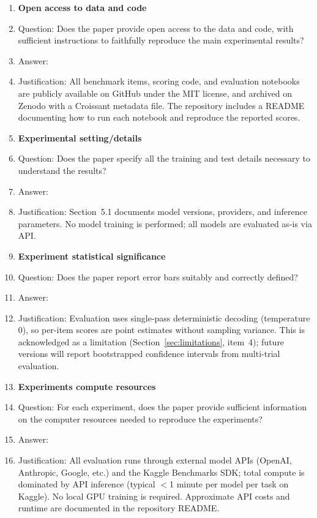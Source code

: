 \documentclass{article}
\begin{document}
\begin{enumerate}
\item \textbf{Open access to data and code}
    \item[] Question: Does the paper provide open access to the data and code, with sufficient instructions to faithfully reproduce the main experimental results?
    \item[] Answer: \answerYes{}
    \item[] Justification: All benchmark items, scoring code, and evaluation notebooks are publicly available on GitHub under the MIT license, and archived on Zenodo with a Croissant metadata file. The repository includes a README documenting how to run each notebook and reproduce the reported scores.

\item \textbf{Experimental setting/details}
    \item[] Question: Does the paper specify all the training and test details necessary to understand the results?
    \item[] Answer: \answerYes{}
    \item[] Justification: Section~5.1 documents model versions, providers, and inference parameters. No model training is performed; all models are evaluated as-is via API.

\item \textbf{Experiment statistical significance}
    \item[] Question: Does the paper report error bars suitably and correctly defined?
    \item[] Answer: \answerNo{}
    \item[] Justification: Evaluation uses single-pass deterministic decoding (temperature 0), so per-item scores are point estimates without sampling variance. This is acknowledged as a limitation (Section~\ref{sec:limitations}, item~4); future versions will report bootstrapped confidence intervals from multi-trial evaluation.

\item \textbf{Experiments compute resources}
    \item[] Question: For each experiment, does the paper provide sufficient information on the computer resources needed to reproduce the experiments?
    \item[] Answer: \answerYes{}
    \item[] Justification: All evaluation runs through external model APIs (OpenAI, Anthropic, Google, etc.) and the Kaggle Benchmarks SDK; total compute is dominated by API inference (typical $<$1 minute per model per task on Kaggle). No local GPU training is required. Approximate API costs and runtime are documented in the repository README.


\end{enumerate}
\end{document}
